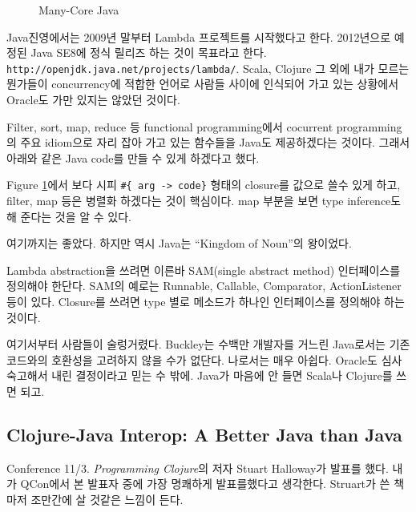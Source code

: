 \documentclass[11pt]{article}
\begin{document}
\begin{figure}[t]
    \begin{Frame}
        \begin{center}
        \end{center}
    \end{Frame}
    \caption{Many-Core Java}
    \label{lambda}
\end{figure}

Java진영에서는 2009년 말부터 Lambda 프로젝트를 시작했다고 한다. 
2012년으로 예정된 Java SE8에 정식 릴리즈 하는 것이 목표라고 한다.
\texttt{http://openjdk.java.net/projects/lambda/}.
Scala, Clojure 그 외에 내가 모르는 뭔가들이 concurrency에 적합한 언어로
사람들 사이에 인식되어 가고 있는 상황에서 Oracle도 가만 있지는 않았던
것이다.

Filter, sort, map, reduce 등 functional programming에서 cocurrent
programming의 주요 idiom으로 자리 잡아 가고 있는 함수들을 Java도
제공하겠다는 것이다. 그래서 아래와 같은 Java code를 만들 수 있게
하겠다고 했다.
 
Figure \ref{lambda}에서 보다 시피 \verb=#{ arg -> code}= 형태의 closure를 
값으로 쓸수 있게 하고, filter, map 등은 병렬화 하겠다는 것이 핵심이다. 
map 부분을 보면 type inference도 해 준다는 것을 알 수 있다.
 
여기까지는 좋았다. 하지만 역시 Java는 ``Kingdom of Noun''\cite{yegge}의 
왕이었다.
 
Lambda abstraction을 쓰려면 이른바 SAM(single abstract method)
인터페이스를 정의해야 한단다.  SAM의 예로는 Runnable, Callable,
Comparator, ActionListener 등이 있다. Closure를 쓰려면 type 별로
메소드가 하나인 인터페이스를 정의해야 하는 것이다.
 
여기서부터 사람들이 술렁거렸다. Buckley는 수백만 개발자를 거느린
Java로서는 기존 코드와의 호환성을 고려하지 않을 수가 없단다. 나로서는
매우 아쉽다. Oracle도 심사 숙고해서 내린 결정이라고 믿는 수 밖에. Java가
마음에 안 들면 Scala나 Clojure를 쓰면 되고.

\subsection{Clojure-Java Interop: A Better Java than Java}


Conference 11/3.
\textit{Programming Clojure}\cite{halloway}의 저자 Stuart Halloway가 발표를 
했다. 내가 QCon에서 본 발표자 중에 가장 명쾌하게 발표를했다고 생각한다. 
Struart가 쓴 책 마저 조만간에 살 것같은 느낌이 든다.
 
\end{document}
